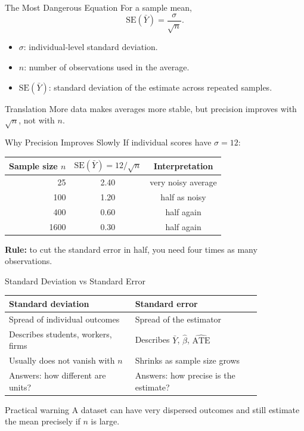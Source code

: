 \documentclass[11pt,aspectratio=169]{beamer}
\newcommand{\se}{\mathrm{SE}}
\newcommand{\ATE}{\mathrm{ATE}}
\newcommand{\derivbutton}[1]{\vspace{0.4em}\hfill\hyperlink{app:#1}{\beamerbutton{Appendix details}}}
\begin{document}
\begin{frame}{The Most Dangerous Equation}
  \hypertarget{main:dangerous-equation}{}
  For a sample mean,
  \[
    \se(\bar{Y})=\frac{\sigma}{\sqrt{n}}.
  \]
  \begin{itemize}
    \item \(\sigma\): individual-level standard deviation.
    \item \(n\): number of observations used in the average.
    \item \(\se(\bar{Y})\): standard deviation of the estimate across repeated samples.
  \end{itemize}
  \begin{block}{Translation}
    More data makes averages more stable, but precision improves with \(\sqrt{n}\), not with \(n\).
  \end{block}
  \derivbutton{mean-variance}
\end{frame}

\begin{frame}{Why Precision Improves Slowly}
  If individual scores have \(\sigma=12\):
  \begin{center}
  \begin{tabular}{rcc}
    \toprule
    Sample size \(n\) & \(\se(\bar{Y})=12/\sqrt{n}\) & Interpretation \\
    \midrule
    25 & 2.40 & very noisy average \\
    100 & 1.20 & half as noisy \\
    400 & 0.60 & half again \\
    1600 & 0.30 & half again \\
    \bottomrule
  \end{tabular}
  \end{center}
  \vspace{0.4em}
  \textbf{Rule:} to cut the standard error in half, you need four times as many observations.
\end{frame}

\begin{frame}{Standard Deviation vs Standard Error}
  \begin{center}
  \begin{tabular}{p{0.42\linewidth}p{0.42\linewidth}}
    \toprule
    Standard deviation & Standard error \\
    \midrule
    Spread of individual outcomes & Spread of the estimator \\
    Describes students, workers, firms & Describes \(\bar{Y}\), \(\hat{\beta}\), \(\widehat{\ATE}\) \\
    Usually does not vanish with \(n\) & Shrinks as sample size grows \\
    Answers: how different are units? & Answers: how precise is the estimate? \\
    \bottomrule
  \end{tabular}
  \end{center}
  \vspace{0.4em}
  \begin{block}{Practical warning}
    A dataset can have very dispersed outcomes and still estimate the mean precisely if \(n\) is large.
  \end{block}
\end{frame}
\end{document}
